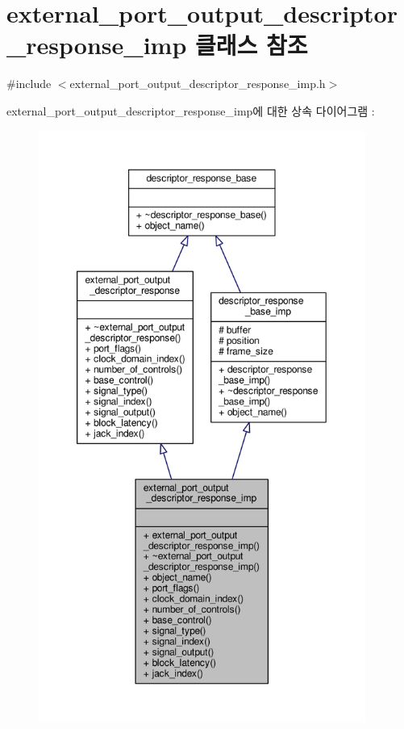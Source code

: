 \hypertarget{classavdecc__lib_1_1external__port__output__descriptor__response__imp}{}\section{external\+\_\+port\+\_\+output\+\_\+descriptor\+\_\+response\+\_\+imp 클래스 참조}
\label{classavdecc__lib_1_1external__port__output__descriptor__response__imp}


{\ttfamily \#include $<$external\+\_\+port\+\_\+output\+\_\+descriptor\+\_\+response\+\_\+imp.\+h$>$}



external\+\_\+port\+\_\+output\+\_\+descriptor\+\_\+response\+\_\+imp에 대한 상속 다이어그램 \+: 
\nopagebreak
\begin{figure}[H]
\begin{center}
\leavevmode
\includegraphics[height=550pt]{classavdecc__lib_1_1external__port__output__descriptor__response__imp__inherit__graph}
\end{center}
\end{figure}


